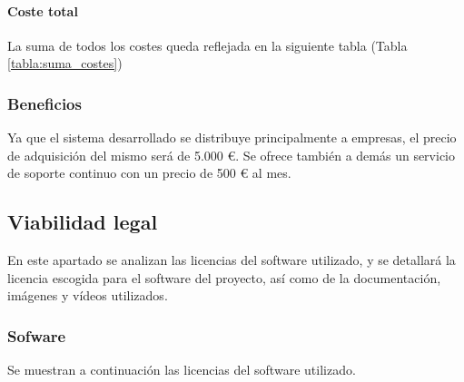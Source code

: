 \paragraph{Coste total}

La suma de todos los costes queda reflejada en la siguiente tabla (Tabla \ref{tabla:suma_costes})


\subsubsection{Beneficios}

Ya que el sistema desarrollado se distribuye principalmente a empresas, el precio de adquisición del
mismo será de 5.000 €. Se ofrece también a demás un servicio de soporte continuo con un precio de 
500 € al mes.


\subsection{Viabilidad legal}

En este apartado se analizan las licencias del software utilizado, y se detallará la licencia 
escogida para el software del proyecto, así como de la documentación, imágenes y vídeos utilizados.

\subsubsection{Sofware}

Se muestran a continuación las licencias del software utilizado.

